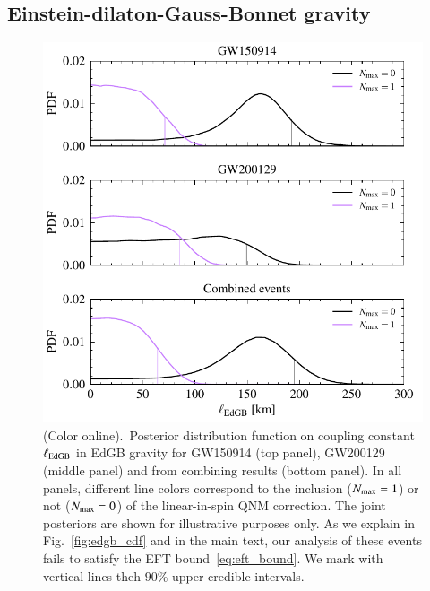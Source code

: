 \documentclass[twocolumn,
               prd,
               aps,
               superscriptaddress,
               tightenlines,
               nofootinbib,
               eqsecnum,
               amsfonts,
               amsmath,
               longbibliography]{revtex4-1}
\newcommand{\hs}[1]{{\textcolor{TealBlue}{{#1}}}}
\begin{document}



\subsection{Einstein-dilaton-Gauss-Bonnet gravity}
\label{sec:results_edgb}

\begin{figure}[t]
\includegraphics[width=\columnwidth]{figs/edgb_posteriors_combined.pdf}
\caption{(Color online).~Posterior distribution function on coupling constant $\ell_{\rm EdGB}$ in EdGB gravity
for GW150914 (top panel), GW200129 (middle panel)
and from combining results (bottom panel).
%
In all panels, different line colors correspond to the inclusion ($N_{\rm max} = 1$) or not ($N_{\rm max} = 0$)
of the linear-in-spin QNM correction.
%
The joint posteriors are shown for illustrative purposes only. As we explain in Fig.~\ref{fig:edgb_cdf} and
in the main text, our analysis of these events fails to satisfy the EFT bound~\eqref{eq:eft_bound}. We mark
with vertical lines theh $90\%$ upper credible intervals.}
\label{fig:edgb_exec_sum}
\end{figure}
\end{document}
